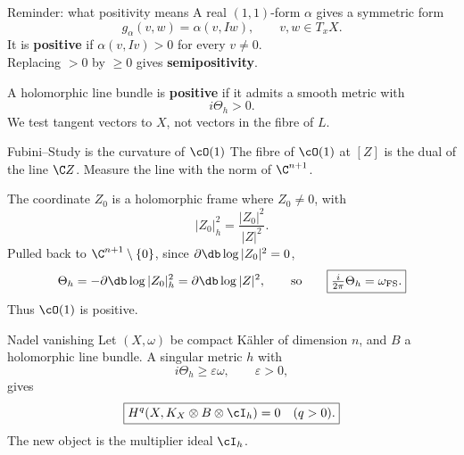 \begin{frame}{Reminder: what positivity means}
A real \((1,1)\)-form \(\alpha\) gives a symmetric form
\[
g_\alpha(v,w)=\alpha(v,Iw),\qquad v,w\in T_xX.
\]
It is \textbf{positive} if \(\alpha(v,Iv)>0\) for every \(v\ne0\).\\
Replacing \(>0\) by \(\ge0\) gives \textbf{semipositivity}.
\par\bigskip
A holomorphic line bundle is \textbf{positive} if it admits a smooth metric with
\[
\boxed{i\Theta_h>0.}
\]
We test tangent vectors to \(X\), not vectors in the fibre of \(L\).
\end{frame}

\begin{frame}{Fubini--Study is the curvature of \(\cO(1)\)}
The fibre of \(\cO(1)\) at \([Z]\) is the dual of the line \(\C Z\).
Measure the line with the norm of \(\C^{n+1}\).
\par\medskip
The coordinate \(Z_0\) is a holomorphic frame where \(Z_0\ne0\), with
\[
|Z_0|_h^2=\frac{|Z_0|^2}{|Z|^2}.
\]
Pulled back to \(\C^{n+1}\setminus\{0\}\), since \(\partial\db\log|Z_0|^2=0\),
\[
\Theta_h=-\partial\db\log|Z_0|_h^2=\partial\db\log|Z|^2,
\qquad\text{so}\qquad
\boxed{\tfrac{i}{2\pi}\Theta_h=\omega_{\rm FS}.}
\]
Thus \(\cO(1)\) is positive.
\end{frame}

\begin{frame}{Nadel vanishing}
Let \((X,\omega)\) be compact Kähler of dimension \(n\), and \(B\) a holomorphic line bundle.
A singular metric \(h\) with
\[
i\Theta_h\ge\varepsilon\omega,\qquad \varepsilon>0,
\]
gives
\[
\boxed{H^q(X,K_X\otimes B\otimes\cI_h)=0\quad(q>0).}
\]
The new object is the multiplier ideal \(\cI_h\).
\end{frame}

